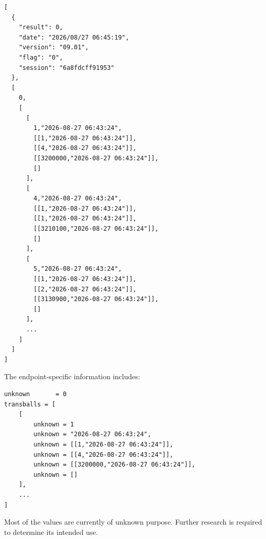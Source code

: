 \begin{lstlisting}
[
  {
    "result": 0,
    "date": "2026/08/27 06:45:19",
    "version": "09.01",
    "flag": "0",
    "session": "6a8fdcff91953"
  },
  [
    0,
    [
      [
		1,"2026-08-27 06:43:24",
        [[1,"2026-08-27 06:43:24"]],
        [[4,"2026-08-27 06:43:24"]],
        [[3200000,"2026-08-27 06:43:24"]],
        []
      ],
      [
        4,"2026-08-27 06:43:24",
        [[1,"2026-08-27 06:43:24"]],
        [[1,"2026-08-27 06:43:24"]],
        [[3210100,"2026-08-27 06:43:24"]],
        []
      ],
      [
        5,"2026-08-27 06:43:24",
        [[1,"2026-08-27 06:43:24"]],
        [[2,"2026-08-27 06:43:24"]],
        [[3130900,"2026-08-27 06:43:24"]],
        []
      ],
      ...
    ]
  ]
]
\end{lstlisting}

\newpage

The endpoint-specific information includes:

\begin{lstlisting}
unknown       = 0
transballs = [
    [
		unknown = 1
        unknown = "2026-08-27 06:43:24",
        unknown = [[1,"2026-08-27 06:43:24"]],
        unknown = [[4,"2026-08-27 06:43:24"]],
        unknown = [[3200000,"2026-08-27 06:43:24"]],
        unknown = []
    ],
    ...
]
\end{lstlisting}

\begin{tcolorbox}[colback=yellow!10,colframe=orange!80!black,title=Warning]
Most of the values are currently of unknown purpose.
Further research is required to determine its intended use.
\end{tcolorbox}

\newpage
